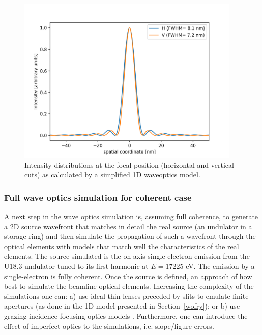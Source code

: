 \documentclass{iucr}              %
\begin{document}
\begin{figure}
\label{wofry1D}
\centering
\includegraphics[width=0.95\textwidth]{GRAPHICS/wofry1D.png}
\caption{Intensity distributions at the focal position (horizontal and vertical cuts) as calculated by a simplified 1D waveoptics model. 
}
\end{figure}


\subsubsection{Full wave optics simulation for coherent case}
\label{srw_se}

A next step in the wave optics simulation is, assuming full coherence, to generate a 2D source wavefront that matches in detail the real source (an undulator in a storage ring) and then simulate the propagation of such a wavefront through the optical elements with models that match well the characteristics of the real elements. The source simulated is the on-axis-single-electron emission from the U18.3 undulator tuned to its first harmonic at $E=17225$ eV. The emission by a single-electron is fully coherent. Once the source is defined, an approach of how best to simulate the beamline optical elements. Increasing the complexity of the simulations one can: a) use ideal thin lenses preceded by slits to emulate finite apertures (as done in the 1D model presented in Section~\ref{wofry}); or b) use grazing incidence focusing optics models \cite{Canestrari2014}. Furthermore, one can introduce the effect of imperfect optics to the simulations, i.e. slope/figure errors. 
\end{document}
